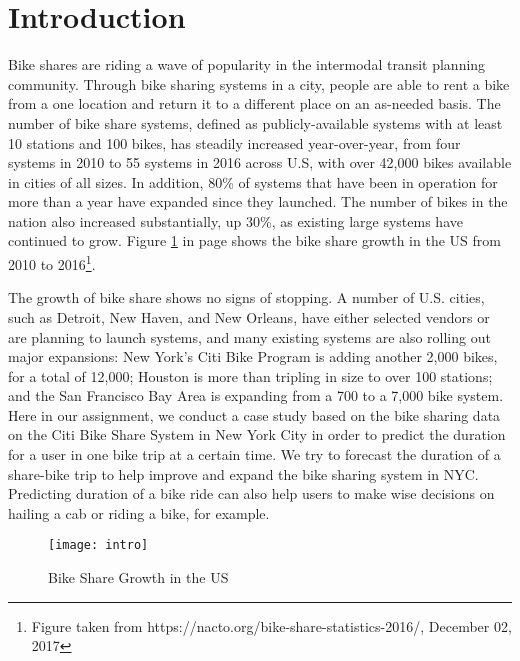 \section{Introduction}

  \par Bike shares are riding a wave of popularity in the intermodal transit planning community. Through bike sharing systems in a city, people are able to rent a bike from a one location and return it to a different place on an as-needed basis. The number of bike share systems, defined as publicly-available systems with at least 10 stations and 100 bikes, has steadily increased year-over-year, from four systems in 2010 to 55 systems in 2016 across U.S, with over 42,000 bikes available in cities of all sizes\cite{us}. In addition, 80\% of systems that have been in operation for more than a year have expanded since they launched. The number of bikes in the nation also increased substantially, up 30\%, as existing large systems have continued to grow. Figure \ref{fig_intro} in page \pageref{fig_intro} shows the bike share growth in the US from 2010 to 2016\footnote{Figure taken from https://nacto.org/bike-share-statistics-2016/, December 02, 2017}.
  \par The growth of bike share shows no signs of stopping. A number of U.S. cities, such as Detroit, New Haven, and New Orleans, have either selected vendors or are planning to launch systems, and many existing systems are also rolling out major expansions: New York's Citi Bike Program \cite{bike} is adding another 2,000 bikes, for a total of 12,000; Houston is more than tripling in size to over 100 stations; and the San Francisco Bay Area is expanding from a 700 to a 7,000 bike system\cite{spread}. Here in our assignment, we conduct a case study based on the bike sharing data on the Citi Bike Share System in New York City in order to predict the duration for a user in one bike trip at a certain time. We try to forecast the duration of a share-bike trip to help improve and expand the bike sharing system in NYC. Predicting duration of a bike ride can also help users to make wise decisions on hailing a cab or riding a bike, for example. 

  \begin{figure}[h]
  \centering
  \texttt{[image: intro]}
  \caption{Bike Share Growth in the US}
  \label{fig_intro}
  \end{figure}


